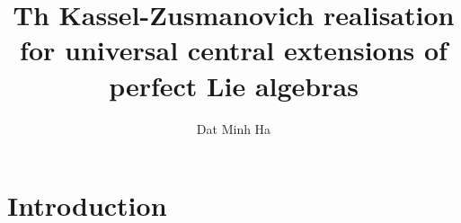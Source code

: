 

\setcounter{section}{-1}





    \title{Th Kassel-Zusmanovich realisation for universal central extensions of perfect Lie algebras}
    
    \author{Dat Minh Ha}
    \maketitle
    
    \begin{abstract}
    
    \end{abstract}
    
    {
    \hypersetup{} 
    \tableofcontents %
    }

    \section{Introduction}

    

    
    
    \printbibliography


